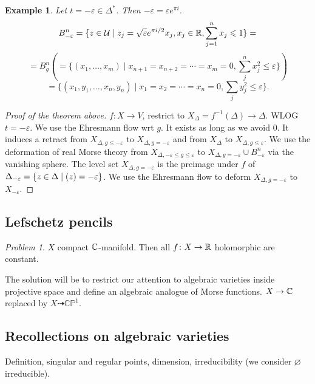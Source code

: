 \documentclass[A4paper, british, reqno]{amsart}
\theoremstyle{darkgreentheorem}
\theoremstyle{darkbluedefinition}
\theoremstyle{darkredexample}
\newtheorem{exa}[thm]{Example}
\theoremstyle{remark}
\newtheorem{pbl}[thm]{Problem}
\let\Re\relax
\DeclareMathOperator{\Re}{Re}
\newcommand{\CP}{\mathbb{CP}}
\newcommand{\1}{\mathbbm{1}}
\begin{document}
\begin{exa}
    Let $t=-\varepsilon \in \Delta^{*}$.
    Then $-\varepsilon =\varepsilon e^{\pi i}$.
    \[ B_{-\varepsilon}^{n}=\{z\in \mathcal{U}\mid z_{j}=\sqrt{\varepsilon}e^{\pi i/2}x_{j},x_{j}\in \mathbb{R},\sum_{j=1}^{n}x_{j}\leqslant 1\}= \]
    \[ =B_{g}^{n}(=\{ (x_{1},\ldots,x_{m})\mid x_{n+1}=x_{n+2}=\cdots =x_{m}=0 ,\sum_{j}^{n} x_{j}^{2}\leqslant \varepsilon \}) \]
    \[ = \{ (x_{1},y_{1},\ldots,x_{n},y_{n})\mid x_{1}=x_{2}=\cdots=x_{n}=0,\sum_{j}y_{j}^{2}\leqslant \varepsilon \}.\]
\end{exa}

\begin{proof}[Proof of the theorem above]
    $f\colon X\to V$, restrict to $X_{\Delta}=f^{-1}(\Delta)\to \Delta$.
    WLOG $t=-\varepsilon$.
    We use the Ehresmann flow wrt $g$.
    It exists as long as we avoid $0$.
    It induces a retract from $X_{\Delta,g\leqslant -\varepsilon }$ to $X_{\Delta,g=-\varepsilon}$ and from $X_{\Delta}$ to $X_{\Delta,g\leqslant \varepsilon}$.
    We use the deformation of real Morse theory from $X_{\Delta, -\varepsilon \leqslant g\leqslant \varepsilon }$ to $X_{\Delta,g=-\varepsilon}\cup B_{-\varepsilon}^{n}$ via the vanishing sphere.
    The level set $X_{\Delta,g=-\varepsilon}$ is the preimage under $f$ of $\Delta_{-\varepsilon}=\{z\in \Delta\mid \Re(z)=-\varepsilon\}$.
    We use the Ehresmann flow to deform $X_{\Delta,g=-\varepsilon }$ to $X_{-\varepsilon}$.
\end{proof}

\subsection{Lefschetz pencils}

\begin{pbl}
    $X$ compact $\mathbb{C}$-manifold.
    Then all $f\colon X\to \mathbb{R}$ holomorphic are constant.
\end{pbl}

The solution will be to restrict our attention to algebraic varieties inside projective space and define an algebraic analogue of Morse functions.
$X\to \mathbb{C}$ replaced by $X\dashrightarrow \CP^{1}$.

\subsection{Recollections on algebraic varieties}
Definition, singular and regular points, dimension, irreducibility (we consider $\varnothing$ irreducible).
\end{document}
